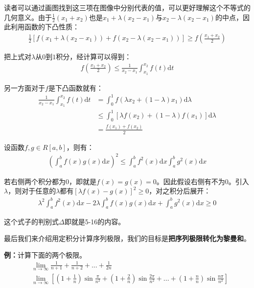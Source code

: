 \documentclass{ctexart}
\let\oldtextbf\textbf %
\renewcommand{\textbf}[1]{\textcolor{btex}{\oldtextbf{#1}}} %
\begin{document}
读者可以通过画图找到这三项在图像中分别代表的值，可以更好理解这个不等式的几何意义。由于$\frac{1}{2}(x_1+x_2)$也是$x_1+\lambda(x_2-x_1)$与$x_2-\lambda(x_2-x_1)$的中点，因此利用函数的下凸性质：
\begin{align*}
    \frac{1}{2}[f(x_1+\lambda(x_2-x_1))+f(x_2-\lambda(x_2-x_1))]\geq f(\frac{x_1+x_2}{2})
\end{align*}

把上式对$\lambda$从$0$到$1$积分，经计算可以得到：
\begin{align*}
     f(\frac{x_1+x_2}{2})\leq \frac{1}{x_2-x_1}\int_{x_1}^{x_2}f(t)\mathrm{d}t
\end{align*}

另一方面对于$f$是下凸函数就有：
\begin{align*}
    \frac{1}{x_2-x_1}\int_{x_1}^{x_2}f(t)\mathrm{d}t&=\int_0^1 f(\lambda x_2+(1-\lambda )x_1)\mathrm{d}\lambda\\
    &\leq \int_0^1[\lambda f(x_2)+(1-\lambda)f(x_1)]\mathrm{d}\lambda\\
    &=\frac{f(x_1)+f(x_2)}{2}
\end{align*}

\begin{tcolorbox}[
    colback=bac1,     %
    colframe=fra1,   %
    coltitle=white,             %
    coltext=tex1,
    title=Schwarz积分不等式,
    fonttitle=\bfseries,        %
arc=3mm,                     %
breakable
]
设函数$f,g\in R[a,b]$，则有：
\begin{align*}
    \left(\int_a^b f(x)g(x)\mathrm{d}x\right)^2\leq \int_a^b f^2(x)\mathrm{d}x \int_a^b g^2(x)\mathrm{d}x\tag{5-16}
\end{align*}
\end{tcolorbox}

若右侧两个积分都为0，即就是$f(x)=g(x)=0$。因此假设右侧有不为0。引入$\lambda$，则对于任意的$\lambda$都有$[\lambda f(x)-g(x)]^2\geq 0$，对之积分后展开：
\begin{align*}
    \lambda^2\int_a^b f^2(x)\mathrm{d}x-2\lambda\int_a^b f(x)g(x)\mathrm{d}x+\int_a^b g^2(x)\mathrm{d}x\geq 0
\end{align*}

这个式子的判别式$\Delta$即就是5-16的内容。

最后我们来介绍用定积分计算序列极限，我们的目标是\textbf{把序列极限转化为黎曼和}。

\textbf{例：}计算下面的两个极限。
\begin{align*}
    &\lim_{n\to\infty}\frac{1}{n+1}+\frac{1}{n+2}+...+\frac{1}{2n}\\
    &\lim_{n\to\infty}\left[(1+\frac{1}{n})\sin\frac{\pi}{n^2}+(1+\frac{2}{n})\sin\frac{2\pi}{n^2}+...+(1+\frac{n}{n})\sin\frac{n\pi}{n^2}\right]
\end{align*}
\end{document}
